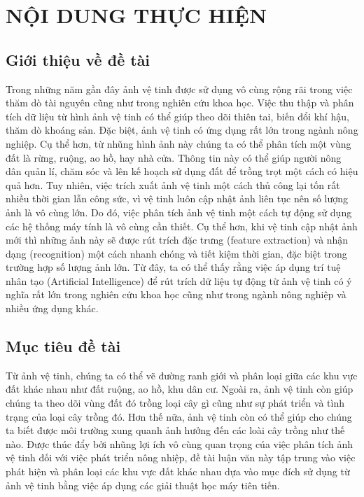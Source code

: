 \documentclass{article}[14pt]
\begin{document}
	\section{NỘI DUNG THỰC HIỆN}
	{
		
		
		\subsection{Giới thiệu về đề tài}
		
		Trong những năm gần đây ảnh vệ tinh được sử dụng vô
		cùng rộng rãi trong việc thăm dò tài nguyên  cũng như trong nghiên cứu khoa học. Việc thu thập và phân tích  dữ liệu từ hình ảnh vệ tinh có thể giúp theo dõi thiên tai, biến đổi khí hậu, thăm dò khoáng sản. Đặc biệt, ảnh vệ tinh có ứng dụng rất lớn trong ngành nông nghiệp. Cụ thể hơn, từ nhũng hình ảnh này chúng ta có thể phân tích một vùng đất là rừng, ruộng, ao hồ, hay nhà cửa. Thông tin này có thể giúp người nông dân quản lí, chăm sóc và lên kế hoạch sử dụng đất để trồng trọt một cách có hiệu quả hơn. Tuy nhiên, việc trích xuất ảnh vệ tinh một cách thủ công lại tốn rất nhiều thời gian lẫn công sức, vì vệ tinh luôn cập nhật ảnh liên tục nên số lượng ảnh là vô cùng lớn. Do đó, việc phân tích ảnh vệ tinh một cách tự động sử dụng các hệ thống máy tính là vô cùng cần thiết. Cụ thể hơn, khi vệ tinh cập nhật ảnh mới thì những ảnh này sẽ được rút trích đặc trưng (feature extraction) và nhận dạng (recognition) một cách nhanh chóng và tiết kiệm thời gian, đặc biệt trong trường hợp số lượng ảnh lớn. Từ đây, ta có thể thấy rằng việc áp dụng trí tuệ nhân tạo (Artificial Intelligence) để rút trích dữ liệu tự động từ ảnh vệ tinh có ý nghĩa rất lớn trong nghiên cứu khoa học cũng như trong ngành nông nghiệp và nhiều ứng dụng khác. 
		
		
		\subsection{Mục tiêu đề tài}
		
		Từ ảnh vệ tinh, chúng ta có thể vẽ đường ranh giới và phân loại giữa các khu vực đất khác nhau như đất ruộng, ao hồ, khu dân cư. Ngoài ra, ảnh vệ tinh còn giúp chúng ta theo dõi vùng đất đó trồng loại cây gì cũng như sự phát triển và tình trạng của loại cây trồng đó. Hơn thế nữa, ảnh vệ tinh còn có thể giúp cho chúng ta biết được môi trường xung quanh ảnh hưởng đến các loài cây trồng như thế nào. Được thúc đẩy bởi nhũng lợi ích vô cùng quan trọng cúa việc phân tích ảnh vệ tinh đối với việc phát triển nông nhiệp, đề tài luận văn này tập trung vào việc phát hiện và phân loại các khu vực đất khác nhau dựa vào mục đích sử dụng từ ảnh vệ tinh bằng việc áp dụng các giải thuật học máy tiên tiến. 
		
}
\end{document}
